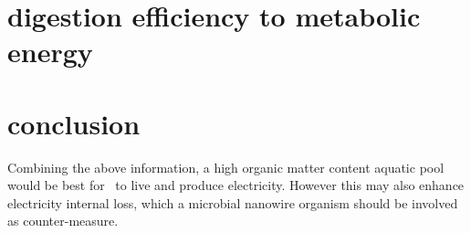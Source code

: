 \documentclass[a4paper,11pt]{article}
\begin{document}
    \section{digestion efficiency to metabolic energy}
    
    \section{conclusion}
    Combining the above information, a high organic matter content aquatic pool would be best for \ec\ to live and produce electricity.  However this may also enhance electricity internal loss, which a microbial nanowire organism should be involved as counter-measure.
    
    \nocite{*}\printbibliography
\end{document}
